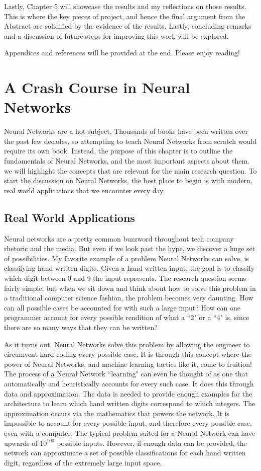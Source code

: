 \documentclass[12pt]{report}
\begin{document}
Lastly, Chapter 5 will showcase the results and my reflections on those results. This is where the key pieces of project, and hence the final argument from the Abstract are solidified by the evidence of the results. Lastly, concluding remarks and a discussion of future steps for improving this work will be explored.

Appendices and references will be provided at the end. Please enjoy reading!

\chapter{A Crash Course in Neural Networks}
\label{cc}
Neural Networks are a hot subject. Thousands of books have been written over the past few decades, so attempting to teach Neural Networks from scratch would require its own book. Instead, the purpose of this chapter is to outline the fundamentals of Neural Networks, and the most important aspects about them. we will highlight the concepts that are relevant for the main research question. To start the discussion on Neural Networks, the best place to begin is with modern, real world applications that we encounter every day.

\section{Real World Applications}
Neural networks are a pretty common buzzword throughout tech company rhetoric and the media. But even if we look past the hype, we discover a huge set of possibilities. My favorite example of a problem Neural Networks can solve, is classifying hand written digits. Given a hand written input, the goal is to classify which digit between 0 and 9 the input represents. The research question seems fairly simple, but when we sit down and think about how to solve this problem in a traditional computer science fashion, the problem becomes very daunting. How can all possible cases be accounted for with such a large input? How can one programmer account for every possible rendition of what a ``2" or a ``4" is, since there are so many ways that they can be written?

As it turns out, Neural Networks solve this problem by allowing the engineer to circumvent hard coding every possible case. It is through this concept where the power of Neural Networks, and machine learning tactics like it, come to fruition! The process of a Neural Network ``learning" can even be thought of as one that automatically and heuristically accounts for every such case. It does this through data and approximation. The data is needed to provide enough examples for the architecture to learn which hand written digits correspond to which integers. The approximation occurs via the mathematics that powers the network. It is impossible to account for every possible input, and therefore every possible case. even with a computer. The typical problem suited for a Neural Network can have upwards of $10^{100}$ possible inputs. However, if enough data can be provided, the network can approximate a set of possible classifications for each hand written digit, regardless of the extremely large input space.
\end{document}
